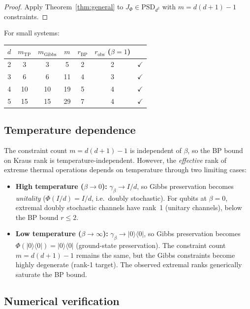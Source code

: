 \documentclass[11pt,a4paper]{article}
\theoremstyle{definition}
\newcommand{\PSD}{\mathrm{PSD}}
\newcommand{\ket}[1]{|#1\rangle}
\newcommand{\bra}[1]{\langle#1|}
\begin{document}
\begin{proof}
Apply Theorem~\ref{thm:general} to $J_\Phi \in \PSD_{d^2}$ with
$m = d(d{+}1) - 1$ constraints.
\end{proof}

For small systems:

\begin{center}
\begin{tabular}{ccccccc}
\toprule
$d$ & $m_{\mathrm{TP}}$ & $m_{\mathrm{Gibbs}}$ & $m$
  & $r_{\mathrm{BP}}$ & $r_{\mathrm{obs}}$ ($\beta{=}1$) & \\
\midrule
2 &  3 &  3 &   5 &  2 & 2 & $\checkmark$ \\
3 &  6 &  6 &  11 &  4 & 3 & $\checkmark$ \\
4 & 10 & 10 &  19 &  5 & 4 & $\checkmark$ \\
5 & 15 & 15 &  29 &  7 & 4 & $\checkmark$ \\
\bottomrule
\end{tabular}
\end{center}

\subsection{Temperature dependence}

The constraint count $m = d(d{+}1) - 1$ is independent of $\beta$,
so the BP bound on Kraus rank is temperature-independent.  However,
the \emph{effective} rank of extreme thermal operations depends on
temperature through two limiting cases:

\begin{itemize}
\item \textbf{High temperature ($\beta \to 0$):}
  $\gamma_\beta \to I/d$, so Gibbs preservation becomes
  \emph{unitality} ($\Phi(I/d) = I/d$, i.e.\ doubly stochastic).
  For qubits at $\beta = 0$, extremal doubly stochastic channels
  have rank~1 (unitary channels), below the BP bound $r \leq 2$.

\item \textbf{Low temperature ($\beta \to \infty$):}
  $\gamma_\beta \to \ket{0}\!\bra{0}$, so Gibbs preservation
  becomes $\Phi(\ket{0}\!\bra{0}) = \ket{0}\!\bra{0}$
  (ground-state preservation).  The constraint count
  $m = d(d{+}1) - 1$ remains the same, but the Gibbs constraints
  become highly degenerate (rank-1 target).  The observed extremal
  ranks generically saturate the BP bound.
\end{itemize}

\subsection{Numerical verification}
\end{document}
